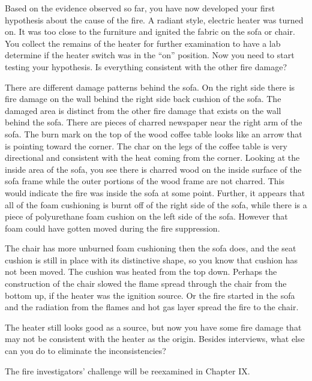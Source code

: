 \documentclass[twoside]{uocthesis}
\begin{document}
{Based on the evidence observed so far, you have now developed your first hypothesis about the cause of the fire.  A radiant style, electric heater was turned on.  It was too close to the furniture and ignited the fabric on the sofa or chair.  You collect the remains of the heater for further examination to have a lab determine if the heater switch was in the ``on'' position.  Now you need to start testing your hypothesis.  Is everything consistent with the other fire damage?  

There are different damage patterns behind the sofa.  On the right side there is fire damage on the wall behind the right side back cushion of the sofa. The damaged area is distinct from the other fire damage that exists on the wall behind the sofa. There are pieces of charred newspaper near the right arm of the sofa.  The burn mark on the top of the wood coffee table looks like an arrow that is pointing toward the corner.  The char on the legs of the coffee table is very directional and consistent with the heat coming from the corner.  Looking at the inside area of the sofa, you see there is charred wood on the inside surface of the sofa frame while the outer portions of the wood frame are not charred.  This would indicate the fire was inside the sofa at some point.  Further, it appears that all of the foam cushioning is burnt off of the right side of the sofa, while there is a piece of polyurethane foam cushion on the left side of the sofa.  However that foam could have gotten moved during the fire suppression. 

The chair has more unburned foam cushioning then the sofa does, and the seat cushion is still in place with its distinctive shape, so you know that cushion has not been moved.  The cushion was heated from the top down.  Perhaps the construction of the chair slowed the flame spread through the chair from the bottom up, if the heater was the ignition source.  Or the fire started in the sofa and the radiation from the flames and hot gas layer spread the fire to the chair.  

The heater still looks good as a source, but now you have some fire damage that may not be consistent with the heater as the origin.  Besides interviews, what else can you do to eliminate the inconsistencies?   

The fire investigators' challenge will be reexamined in Chapter IX.     

}
\end{document}
